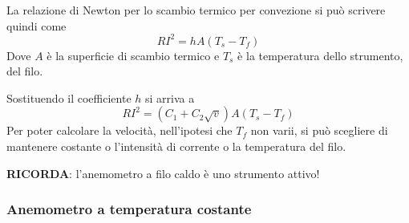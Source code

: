 \documentclass[a4paper, 15pt]{article}
\begin{document}
\begin{adjustwidth}{2in}{}
	La relazione di Newton per lo scambio termico per convezione si può scrivere quindi come 
	\[RI^2 = hA(T_s - T_f)\]
	Dove $A$ è la superficie di scambio termico e $T_s$ è la temperatura dello strumento, del filo.\newline 
	
	Sostituendo il coefficiente $h$ si arriva a 
	\[RI^2 = (C_1 + C_2\sqrt{v})A(T_s - T_f)\]
	Per poter calcolare la velocità, nell'ipotesi che $T_f$ non varii, si può scegliere di mantenere costante o l'intensità di corrente o la temperatura del filo. \newline
	
	\textbf{RICORDA}: l'anemometro a filo caldo è uno strumento attivo!  
\end{adjustwidth}
\newpage
\subsubsection{Anemometro a temperatura costante}
\end{document}
